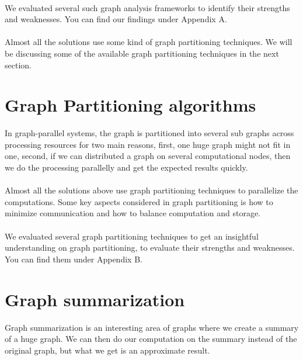\documentclass[12pt]{report}
\numberwithin{figure}{section}
\numberwithin{table}{section}
\begin{document}
\paragraph{}

We evaluated several such graph analysis frameworks to identify their strengths and weaknesses. You can find our findings under Appendix A.

\paragraph{}

Almost all the solutions use some kind of graph partitioning techniques. We will be discussing some of the available graph partitioning techniques in the next section.  

\section{Graph Partitioning algorithms}
In graph-parallel systems, the graph is partitioned into several sub graphs across processing resources for two main reasons, first, one huge graph might not fit in one, second, if we can distributed a graph on several computational nodes, then we do the processing parallelly and get the expected results quickly.  

\paragraph{}

Almost all the solutions above use graph partitioning techniques to parallelize the computations. Some key aspects considered in graph partitioning is how to minimize communication and how to balance computation and storage. 

\paragraph{}

We evaluated several graph partitioning techniques to get an insightful understanding on graph partitioning, to evaluate their strengths and weaknesses. You can find them under Appendix B. 

\section{Graph summarization}
Graph summarization is an interesting area of graphs where we create a summary of a huge graph. We can then do our computation on the summary instead of the original graph, but what we get is an approximate result. 
\end{document}
